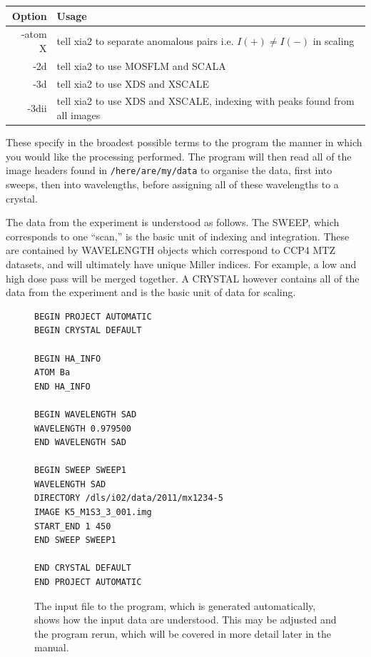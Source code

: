 \documentclass[a4paper, 11pt]{article}
\begin{document}
\begin{center}
\begin{tabular}{|r|p{6cm}|}
\hline
Option & Usage \\
\hline
-atom X & tell xia2 to separate anomalous pairs i.e. $I(+) \ne I(-)$ in 
scaling \\
-2d & tell xia2 to use MOSFLM and SCALA \\
-3d & tell xia2 to use XDS and XSCALE \\
-3dii & tell xia2 to use XDS and XSCALE, indexing with peaks found from
all images \\
\hline
\end{tabular}
\end{center}

\noindent
These specify in the broadest possible terms to the program the manner in
which you would like the processing performed. The program will then read all 
of the image headers found in \verb|/here/are/my/data| to organise the data, 
first into sweeps, then into wavelengths, before assigning all of these
wavelengths to a crystal.

The data from the experiment is understood as follows. The SWEEP, which 
corresponds to one ``scan,'' is the basic unit of indexing and integration.
These are contained by WAVELENGTH objects which correspond to CCP4 MTZ 
datasets, and will ultimately have unique Miller indices. For example, a low
and high dose pass will be merged together. A CRYSTAL however contains all 
of the data from the experiment and is the basic unit of data for scaling.

\begin{figure}
\begin{center}
{\small
\begin{verbatim}
BEGIN PROJECT AUTOMATIC
BEGIN CRYSTAL DEFAULT

BEGIN HA_INFO
ATOM Ba
END HA_INFO

BEGIN WAVELENGTH SAD
WAVELENGTH 0.979500
END WAVELENGTH SAD

BEGIN SWEEP SWEEP1
WAVELENGTH SAD
DIRECTORY /dls/i02/data/2011/mx1234-5
IMAGE K5_M1S3_3_001.img
START_END 1 450
END SWEEP SWEEP1

END CRYSTAL DEFAULT
END PROJECT AUTOMATIC
\end{verbatim}
}
\end{center}
\caption{The input file to the program, which is generated automatically, shows
how the input data are understood. This may be adjusted and the program rerun,
which will be covered in more detail later in the manual.}
\end{figure}
\end{document}

